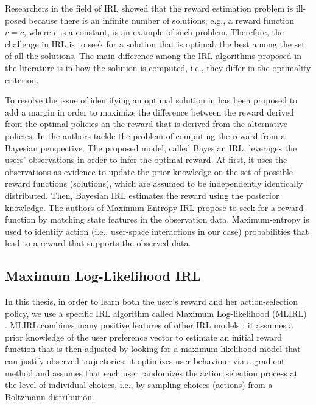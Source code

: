 Researchers in the field of IRL showed that the reward estimation problem is ill-posed because there is an infinite number of solutions, e.g., a reward function $r=c$, where $c$ is a constant, is an example of such problem.
Therefore, the challenge in IRL is to seek for a solution that is optimal, the best among the set of all the solutions. 
The main difference among the IRL algorithms proposed in the literature is in how the solution is computed, i.e., they differ in the optimality criterion.

To resolve the issue of identifying an optimal solution in \cite{ng:2000,irl:optimal_solution:2006} has been proposed to add a margin in order to maximize the difference between the reward derived from the optimal policies an the reward that is derived from the alternative policies.
%
In \cite{bayesianIRL} the authors tackle the problem of computing the reward from a Bayesian perspective. The proposed model, called Bayesian IRL, leverages the users' observations in order to infer the optimal reward. At first, it uses the observations as evidence to update the prior knowledge on the set of possible reward functions (solutions), which are assumed to be independently identically distributed. Then, Bayesian IRL estimates the reward using the posterior knowledge.
%
The authors of Maximum-Entropy IRL \cite{maxentirl} propose to seek for a reward function by matching state features in the observation data. Maximum-entropy is used to identify action (i.e., user-space interactions in our case) probabilities that lead to a reward that supports the observed data.

\subsection{Maximum Log-Likelihood IRL}
In this thesis, in order to learn both the user's reward and her action-selection policy, we use a specific IRL algorithm called Maximum Log-likelihood (MLIRL) \cite{vro:litt:2011}. 
MLIRL combines many positive features of other IRL models \cite{bayesianIRL,maxentirl,policymatchingirl}: it assumes a prior knowledge of the user preference vector to estimate an initial reward function that is then adjusted by looking for a maximum likelihood model that can justify observed trajectories; it optimizes user behaviour via a gradient method and assumes that each user randomizes the action selection process at the level of individual choices, i.e., by sampling choices (actions) from a Boltzmann distribution. 

